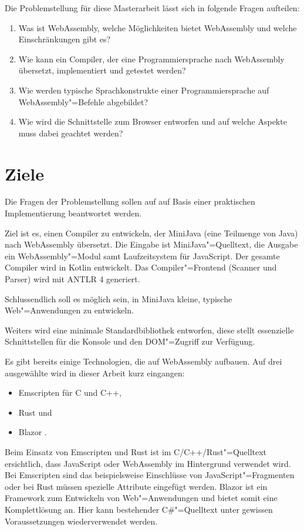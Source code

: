 Die Problemstellung für diese Masterarbeit lässt sich in folgende Fragen aufteilen:

\begin{enumerate}
	\item Was ist WebAssembly, welche Möglichkeiten bietet WebAssembly und welche Einschränkungen gibt es?
	\item Wie kann ein Compiler, der eine Programmiersprache nach WebAssembly übersetzt, implementiert und getestet werden?
	\item Wie werden typische Sprachkonstrukte einer Programmiersprache auf WebAssembly"=Befehle abgebildet?
	\item Wie wird die Schnittstelle zum Browser entworfen und auf welche Aspekte muss dabei geachtet werden?
\end{enumerate}

\section{Ziele}

Die Fragen der Problemstellung sollen auf auf Basis einer praktischen Implementierung beantwortet werden.

Ziel ist es, einen Compiler zu entwickeln, der MiniJava (eine Teilmenge von Java) nach WebAssembly übersetzt. Die Eingabe ist MiniJava"=Quelltext, die Ausgabe ein WebAssembly"=Modul samt Laufzeitsystem für JavaScript. Der gesamte Compiler wird in Kotlin entwickelt. Das Compiler"=Frontend (Scanner und Parser) wird mit ANTLR 4 generiert.

Schlussendlich soll es möglich sein, in MiniJava kleine, typische Web"=Anwendungen zu entwickeln.

Weiters wird eine minimale Standardbibliothek entworfen, diese stellt essenzielle Schnittstellen für die Konsole und den DOM"=Zugriff zur Verfügung.

Es gibt bereits einige Technologien, die auf WebAssembly aufbauen. Auf drei ausgewählte wird in dieser Arbeit kurz eingangen:
\begin{itemize}
    \item Emscripten \cite{Emscripten} für C und C++,
    \item Rust \cite{RustWasmWebsite} und
    \item Blazor \cite{Blazor}.
\end{itemize}

Beim Einsatz von Emscripten und Rust ist im C/C++/Rust"=Quelltext ersichtlich, dass JavaScript oder WebAssembly im Hintergrund verwendet wird. Bei Emscripten sind das beispielsweise Einschlüsse von JavaScript"=Fragmenten oder bei Rust müssen spezielle Attribute eingefügt werden. Blazor ist ein Framework zum Entwickeln von Web"=Anwendungen und bietet somit eine Komplettlösung an. Hier kann bestehender C\#{}"=Quelltext unter gewissen Voraussetzungen wiederverwendet werden.

